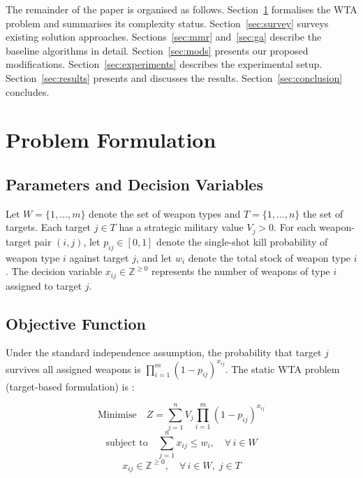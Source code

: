 \documentclass[10pt,conference]{IEEEtran}
\begin{document}
The remainder of the paper is organised as follows.
Section~\ref{sec:problem} formalises the WTA problem and summarises its
complexity status.
Section~\ref{sec:survey} surveys existing solution approaches.
Sections~\ref{sec:mmr} and~\ref{sec:ga} describe the baseline algorithms in
detail.
Section~\ref{sec:mods} presents our proposed modifications.
Section~\ref{sec:experiments} describes the experimental setup.
Section~\ref{sec:results} presents and discusses the results.
Section~\ref{sec:conclusion} concludes.

\section{Problem Formulation}
\label{sec:problem}

\subsection{Parameters and Decision Variables}

Let $W = \{1, \ldots, m\}$ denote the set of weapon types and
$T = \{1, \ldots, n\}$ the set of targets.
Each target $j \in T$ has a strategic military value $V_j > 0$.
For each weapon-target pair $(i, j)$, let $p_{ij} \in [0,1]$ denote the
single-shot kill probability of weapon type $i$ against target $j$, and let
$w_i$ denote the total stock of weapon type $i$.
The decision variable $x_{ij} \in \mathbb{Z}^{\geq 0}$ represents the number
of weapons of type $i$ assigned to target $j$.

\subsection{Objective Function}

Under the standard independence assumption, the probability that target $j$
survives all assigned weapons is
$\prod_{i=1}^{m}(1-p_{ij})^{x_{ij}}$.
The static WTA problem (target-based formulation) is
\cite{ahuja2007,andersen2022}:

\begin{equation}
  \text{Minimise}\quad Z = \sum_{j=1}^{n} V_j \prod_{i=1}^{m} (1-p_{ij})^{x_{ij}}
  \label{eq:obj}
\end{equation}
\begin{equation}
  \text{subject to}\quad \sum_{j=1}^{n} x_{ij} \leq w_i,\quad \forall\, i \in W
  \label{eq:con1}
\end{equation}
\begin{equation}
  x_{ij} \in \mathbb{Z}^{\geq 0},\quad \forall\, i \in W,\; j \in T
  \label{eq:con2}
\end{equation}
\end{document}
